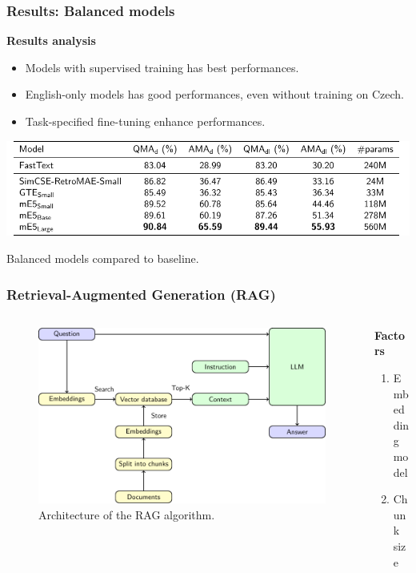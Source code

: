 \documentclass{beamer}
\begin{document}
\begin{frame}
  \frametitle{Results: Balanced models}
  \textcolor{cvut_navy}{\textbf{Results analysis}}
  \begin{itemize}
    \item Models with supervised training has best performances.
    \item English-only models has good performances, even without training on Czech.
    \item Task-specified fine-tuning enhance performances.
  \end{itemize}
  \begin{table}
    \centering
    \includegraphics[scale=0.8]{src/fig/pdfs/tables/balanced.pdf}
    \caption{Balanced models compared to baseline.}
  \end{table}
\end{frame}

\begin{frame}
  \frametitle{Retrieval-Augmented Generation (RAG)}
  \begin{columns}[onlytextwidth,T]
    \begin{column}{0.75\textwidth}
      \begin{figure}[h]
        \includegraphics[scale=0.6]{src/fig/pdfs/tikz/RAG_scheme.pdf}
        \caption{Architecture of the RAG algorithm.}
       \end{figure}
    \end{column}

    \begin{column}{0.75\textwidth}
      \textcolor{cvut_navy}{\textbf{Factors}}
      \begin{enumerate}
        \item Embedding \\model
        \item Chunk size
      \end{enumerate}
    \end{column}
  \end{columns}
\end{frame}
\end{document}
